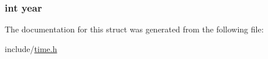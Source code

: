 \subsubsection[{\texorpdfstring{year}{year}}]{\setlength{\rightskip}{0pt plus 5cm}int year}\hypertarget{structdate__time_abeac221e38b7b9ce7df8722c842bf671}{}\label{structdate__time_abeac221e38b7b9ce7df8722c842bf671}


The documentation for this struct was generated from the following file\+:\begin{DoxyCompactItemize}
\item 
include/\hyperlink{time_8h}{time.\+h}\end{DoxyCompactItemize}
